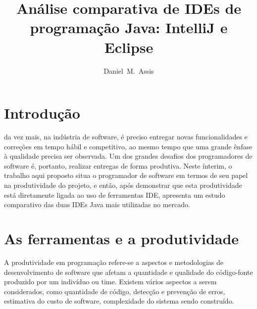 \documentclass[12pt,journal,compsoc]{IEEEtran}
\begin{document}
\title{Análise comparativa de IDEs de programação Java: IntelliJ e Eclipse}
\author{
  Daniel~M.~Assis
}


\maketitle

\IEEEdisplaynotcompsoctitleabstractindextext
\IEEEpeerreviewmaketitle

\section{Introdução}

da vez mais, na indústria de software, é preciso entregar novas funcionalidades e correções em tempo hábil e competitivo, ao mesmo tempo que uma grande ênfase à qualidade precisa ser observada. Um dos grandes desafios dos programadores de software é, portanto, realizar entregas de forma produtiva. Neste ínterim, o trabalho aqui proposto situa o programador de software em termos de seu papel na produtividade do projeto, e então, após demonstrar que esta produtividade está diretamente ligada ao uso de ferramentas IDE\cite{ide_definition}, apresenta um estudo comparativo das duas IDEs Java mais utilizadas no mercado. 

\section{As ferramentas e a produtividade}

A produtividade em programação refere-se a aspectos e metodologias de desenvolvimento de software que afetam a quantidade e qualidade do código-fonte produzido por um indivíduo ou time\cite{programming_productivity}. Existem vários aspectos a serem considerados, como quantidade de código, detecção e prevenção de erros, estimativa do custo de software, complexidade do sistema sendo construído. 
\end{document}
